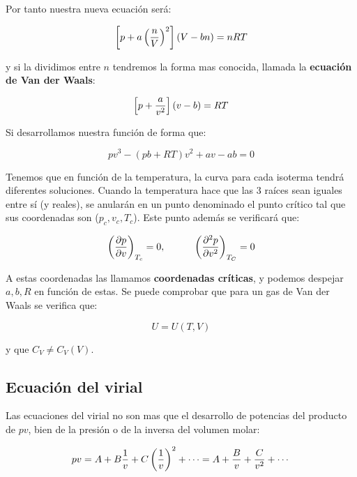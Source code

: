 \documentclass[12pt,a4paper,oneside]{book}
\begin{document}
Por tanto nuestra nueva ecuación será:

\begin{equation}
\left[ p+a\left( \dfrac{n}{V} \right)^2 \right] (V-bn) = nRT
\end{equation}

y si la dividimos entre $n$ tendremos la forma mas conocida, llamada la \textbf{ecuación de Van der Waals}:

\begin{equation}
\left[ p+\dfrac{a}{v^2} \right] (v-b) = RT
\end{equation}

Si desarrollamos nuestra función de forma que:

\begin{equation}
pv^3 - (pb+RT)v^2 +a v - ab = 0
\end{equation}

Tenemos que en función de la temperatura, la curva para cada isoterma tendrá diferentes soluciones. Cuando la temperatura hace que las 3 raíces sean iguales entre sí (y reales), se anularán en un punto denominado el punto crítico tal que sus coordenadas son ($p_c,v_c,T_c$). Este punto además se verificará que:

\begin{equation}
\left( \frac{\partial p}{\partial v} \right)_{T_c} = 0, \quad \quad \quad \left( \frac{\partial ^2 p}{\partial v^2} \right)_{T_C} = 0
\end{equation}

A estas coordenadas las llamamos \textbf{coordenadas críticas}, y podemos despejar $a,b,R$ en función de estas. Se puede comprobar que para un gas de Van der Waals se verifica que:

\begin{equation}
U = U(T,V)
\end{equation}

y que $C_V \neq C_V(V)$.

\subsection{Ecuación del virial}

Las ecuaciones del virial no son mas que el desarrollo de potencias del producto de $pv$, bien de la presión o de la inversa del volumen molar:

\begin{equation}
pv = A + B \dfrac{1}{v} + C \left( \dfrac{1}{v} \right)^2 + \cdots = A + \dfrac{B}{v} + \dfrac{C}{v^2} + \cdots 
\end{equation}
\end{document}
